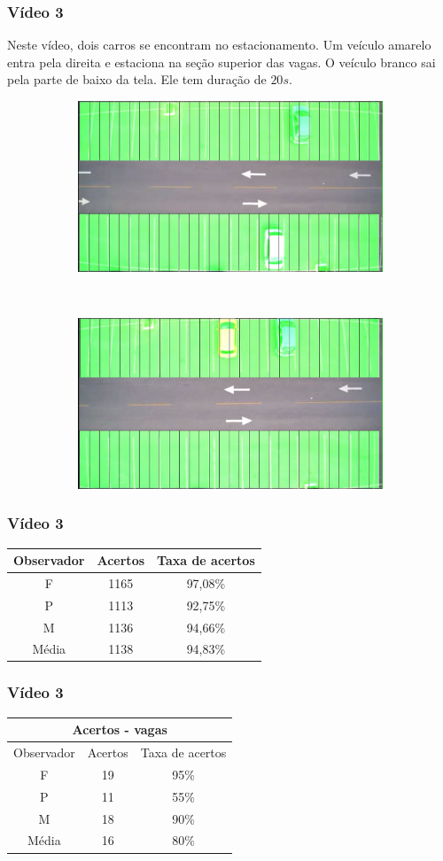 \documentclass{beamer}
\begin{document}
\begin{frame}
\frametitle{Vídeo 3}

Neste vídeo, dois carros se encontram no estacionamento. Um veículo amarelo entra pela direita e estaciona na seção superior das vagas. O veículo branco sai pela parte de baixo da tela. Ele tem duração de $20s$.

\begin{figure}
\centering
\begin{subfigure}{.5\textwidth}
\centering
\includegraphics[width=.5\linewidth]{Video3Inicio}
\end{subfigure}\
\begin{subfigure}{.5\textwidth}
\centering
\includegraphics[width=.5\linewidth]{Video3Fim}
\end{subfigure}
\centering
\end{figure}	
\end{frame}

\begin{frame}
	\frametitle{Vídeo 3}
\begin{center}
\begin{tabular}{|c||c||c|}
\hline
Observador & Acertos & Taxa de acertos \\ \hline
F & 1165 & 97,08\% \\  \hline
P & 1113 & 92,75\% \\ \hline
M & 1136 & 94,66\% \\ \hline
Média & 1138 & 94,83\% \\
\hline
\end{tabular}
\end{center}
\end{frame}

\begin{frame}
\frametitle{Vídeo 3}
\begin{center}
\begin{tabular}{|c||c||c|}
\hline
\multicolumn{3}{|c|}{Acertos - vagas}  \\ \hline \hline
Observador & Acertos & Taxa de acertos \\ \hline
F & 19 & 95\% \\  \hline
P & 11 & 55\% \\ \hline
M & 18 & 90\% \\ \hline
Média & 16 & 80\% \\
\hline
\end{tabular}
\end{center}
\end{frame}
\end{document}
